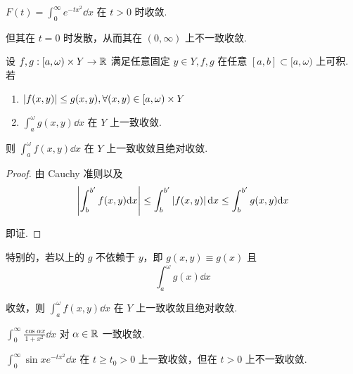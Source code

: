 \begin{example}
    $F(t)=\displaystyle\int_0^\infty e^{-tx^2}\dd x$ 在 $t>0$ 时收敛.
    
    但其在 $t=0$ 时发散，从而其在 $(0,\infty)$ 上不一致收敛.
\end{example}


\begin{property}
    设 $f,g:[a,\omega)\times Y\to\mathbb{R}$ 满足任意固定 $y\in Y,f,g$ 在任意 $[a,b]\subset[a,\omega)$ 上可积. 若

    \begin{enumerate}
        \item $\left\lvert{f(x,y)}\right\rvert\le g(x,y),\forall (x,y)\in [a,\omega)\times Y$
        
        \item $\displaystyle\int_a^\omega g(x,y)\dd x$ 在 $Y$ 上一致收敛.
    \end{enumerate}

    则 $\displaystyle\int_a^\omega f(x,y)\dd x$ 在 $Y$ 上一致收敛且绝对收敛.
\end{property}
\begin{proof}
    由 Cauchy 准则以及
$$
\left\lvert{\int_b^{b'}f(x,y)\mathrm{d}x}\right\rvert\le\int_b^{b'}\left\lvert{f(x,y)}\right\rvert\mathrm{d} x\le\int_b^{b'}g(x,y)\mathrm{d} x
$$

    即证.
\end{proof}


特别的，若以上的 $g$ 不依赖于 $y$，即 $g(x,y)\equiv g(x)$ 且
$$
\int_a^\omega g(x)\dd x
$$

收敛，则 $\displaystyle\int_a^\omega f(x,y)\dd x$ 在 $Y$ 上一致收敛且绝对收敛.

\begin{example}
    $\displaystyle\int_0^\infty\frac{\cos\alpha x}{1+x^2}\dd x$ 对 $\alpha\in\mathbb{R}$ 一致收敛.
\end{example}

\begin{example}
    $\displaystyle\int_0^\infty\sin xe^{-tx^2}\dd x$ 在 $t\ge t_0>0$ 上一致收敛，但在 $t>0$ 上不一致收敛.
\end{example}

